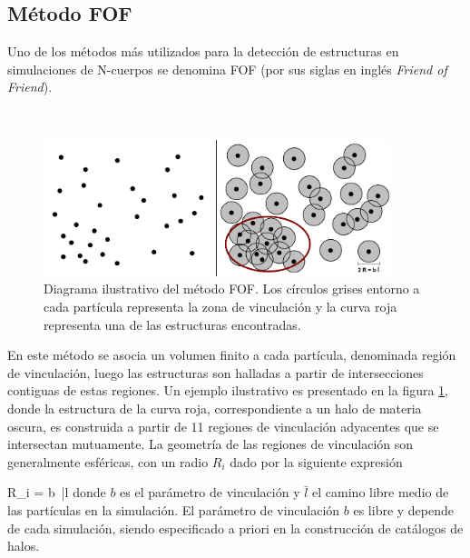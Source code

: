 	\subsection{Método FOF}
	\label{subsec:FOFMethod}
	

Uno de los métodos más utilizados para la detección de estructuras en 
simulaciones de N-cuerpos se denomina FOF (por sus siglas en inglés
\textit{Friend of Friend}).

\
\begin{figure}[htbp]
	\centering
	\includegraphics[width=0.9\textwidth]
	{./figures/3_nbody_simulations/FOF_Method.png}

	\caption{\small{Diagrama ilustrativo del método FOF. Los círculos grises
	entorno a cada partícula representa la zona de vinculación y la curva 
	roja representa una de las estructuras encontradas.}}
	
	\label{fig:FOF_Method}
\end{figure}


En este método se asocia un volumen finito a cada partícula, denominada 
región de vinculación, luego las estructuras son halladas a partir de 
intersecciones contiguas de estas regiones. Un ejemplo ilustrativo es 
presentado en la figura \ref{fig:FOF_Method}, donde la estructura de la curva
roja, correspondiente a un halo de materia oscura, es construida a partir
de 11 regiones de vinculación adyacentes que se intersectan mutuamente.
La geometría de las regiones de vinculación son generalmente esféricas, con
un radio $R_i$ dado por la siguiente expresión


{ R_i = b\ \bar l }
donde $b$ es el parámetro de vinculación y $\bar l$ el camino libre medio 
de las partículas en la simulación. El parámetro de vinculación $b$ es libre 
y depende de cada simulación, siendo especificado a priori en la construcción 
de catálogos de halos.


